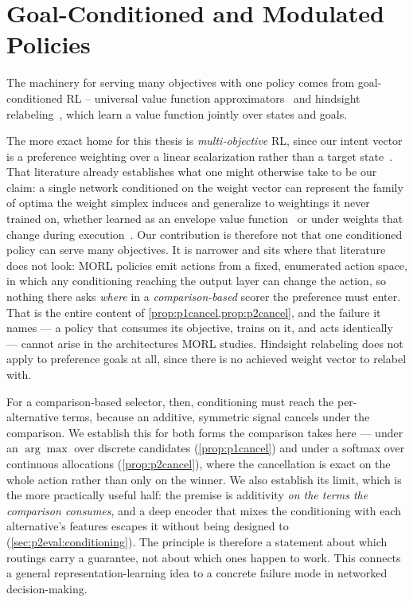 \section{Goal-Conditioned and Modulated Policies}
\label{sec:rel:gcrl}

The machinery for serving many objectives with one policy comes from goal-conditioned RL -- universal value
function approximators~\cite{Schaul2015} and hindsight relabeling~\cite{Andrychowicz2017}, which learn a
value function jointly over states and goals.

The more exact home for this thesis is \emph{multi-objective} RL, since our intent vector is a
preference weighting over a linear scalarization rather than a target state~\cite{Roijers2013}. That
literature already establishes what one might otherwise take to be our claim: a single network
conditioned on the weight vector can represent the family of optima the weight simplex induces and
generalize to weightings it never trained on, whether learned as an envelope value
function~\cite{Yang2019} or under weights that change during execution~\cite{Abels2019}. Our
contribution is therefore not that one conditioned policy can serve many objectives. It is narrower and
sits where that literature does not look: MORL policies emit actions from a fixed, enumerated action
space, in which any conditioning reaching the output layer can change the action, so nothing there asks
\emph{where} in a \emph{comparison-based} scorer the preference must enter. That is the entire content
of \cref{prop:p1cancel,prop:p2cancel}, and the failure it names --- a policy that consumes its objective,
trains on it, and acts identically --- cannot arise in the architectures MORL studies. Hindsight
relabeling does not apply to preference goals at all, since there is no achieved weight vector to
relabel with.

For a comparison-based selector, then, conditioning must
reach the per-alternative terms, because an additive, symmetric signal cancels under the comparison. We
establish this for both forms the comparison takes here --- under an $\arg\max$ over discrete candidates
(\cref{prop:p1cancel}) and under a softmax over continuous allocations (\cref{prop:p2cancel}), where the
cancellation is exact on the whole action rather than only on the winner. We also establish its limit,
which is the more practically useful half: the premise is additivity \emph{on the terms the comparison
consumes}, and a deep encoder that mixes the conditioning with each alternative's features escapes it
without being designed to (\cref{sec:p2eval:conditioning}). The principle is therefore a statement about
which routings carry a guarantee, not about which ones happen to work. This connects a general
representation-learning idea to a concrete failure mode in networked decision-making.

